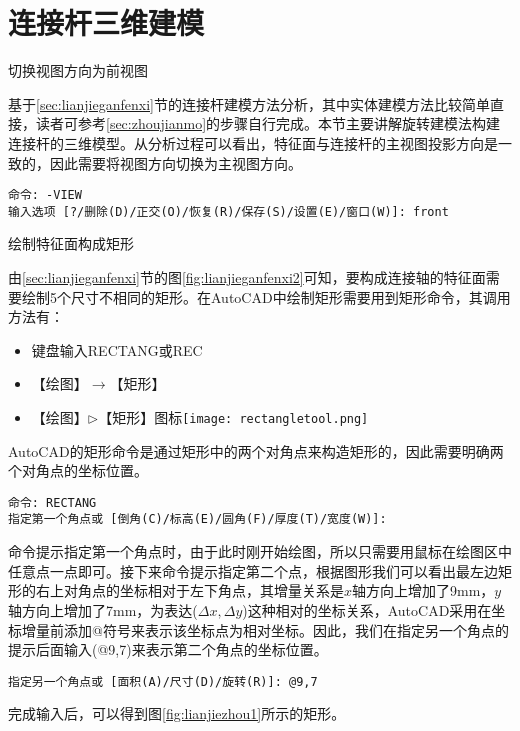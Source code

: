 \section{连接杆三维建模}
\begin{procedure}
\item 切换视图方向为前视图

基于\ref{sec:lianjieganfenxi}节的连接杆建模方法分析，其中实体建模方法比较简单直接，读者可参考\ref{sec:zhoujianmo}的步骤自行完成。本节主要讲解旋转建模法构建连接杆的三维模型。从分析过程可以看出，特征面与连接杆的主视图投影方向是一致的，因此需要将视图方向切换为主视图方向。
\begin{lstlisting}
命令: -VIEW
输入选项 [?/删除(D)/正交(O)/恢复(R)/保存(S)/设置(E)/窗口(W)]: front 
\end{lstlisting}

\item 绘制特征面构成矩形

由\ref{sec:lianjieganfenxi}节的图\ref{fig:lianjieganfenxi2}可知，要构成连接轴的特征面需要绘制5个尺寸不相同的矩形。在AutoCAD中绘制矩形需要用到矩形命令，其调用方法有：
\begin{itemize}
\item 键盘输入RECTANG或REC
\item 【绘图】$\rightarrow$【矩形】
\item 【绘图】$\triangleright$【矩形】图标\texttt{[image: rectangletool.png]}
\end{itemize}

AutoCAD的矩形命令是通过矩形中的两个对角点来构造矩形的，因此需要明确两个对角点的坐标位置。
\begin{lstlisting}
命令: RECTANG
指定第一个角点或 [倒角(C)/标高(E)/圆角(F)/厚度(T)/宽度(W)]:
\end{lstlisting}

命令提示指定第一个角点时，由于此时刚开始绘图，所以只需要用鼠标在绘图区中任意点一点即可。接下来命令提示指定第二个点，根据图形我们可以看出最左边矩形的右上对角点的坐标相对于左下角点，其增量关系是$x$轴方向上增加了9mm，$y$轴方向上增加了7mm，为表达($\Delta x,\Delta y$)这种相对的坐标关系，AutoCAD采用在坐标增量前添加@符号来表示该坐标点为相对坐标。因此，我们在指定另一个角点的提示后面输入(@9,7)来表示第二个角点的坐标位置。
\begin{lstlisting}
指定另一个角点或 [面积(A)/尺寸(D)/旋转(R)]: @9,7
\end{lstlisting}

完成输入后，可以得到图\ref{fig:lianjiezhou1}所示的矩形。


\end{procedure}
